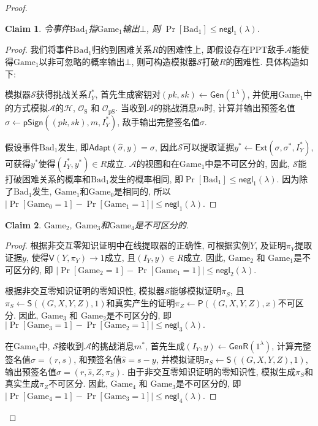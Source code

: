 \documentclass[review]{jcr}
\newtheorem{claim}{Claim}
\begin{document}
\begin{proof}
\begin{claim}
令事件$\text{Bad}_1$指$\text{Game}_1$输出$\bot$, 则 $\Pr[\text{Bad}_1] \leq \mathsf{negl}_1(\lambda)$.
\end{claim}

\begin{proof}
我们将事件$\text{Bad}_1$归约到困难关系$R$的困难性上, 即假设存在PPT敌手$\mathcal{A}$能使得$\text{Game}_1$以非可忽略的概率输出$\bot$, 则可构造模拟器$\mathcal{S}$打破$R$的困难性. 具体构造如下: 

模拟器$\mathcal{S}$获得挑战关系$I_Y^*$, 首先生成密钥对$(pk, sk)\leftarrow \mathsf{Gen}(1^\lambda)$, 并使用$\text{Game}_1$中的方式模拟$\mathcal{A}$的$\mathcal{H}$, $\mathcal{O}_{\text{S}}$ 和 $\mathcal{O}_{\text{pS}}$. 当收到$\mathcal{A}$的挑战消息$m$时, 计算并输出预签名值$\hat{\sigma}\leftarrow \mathsf{pSign}((pk,sk), m, I_Y^*)$, 敌手输出完整签名值$\sigma$. 

假设事件$\text{Bad}_1$发生, 即$\mathsf{Adapt}(\hat{\sigma},y) = \sigma$, 因此$\mathcal{S}$可以提取证据$y^*\leftarrow\mathsf{Ext}(\sigma, \sigma^*, I_Y^*)$, 可获得$y^*$使得$(I_Y^*, y^*)\in R$成立. $\mathcal{A}$的视图和在$\text{Game}_1$中是不可区分的, 因此, $\mathcal{S}$能打破困难关系的概率和$\text{Bad}_1$发生的概率相同, 即$\Pr[\text{Bad}_1] \leq \mathsf{negl}_1(\lambda)$. 因为除了$\text{Bad}_1$发生, $\text{Game}_1$和$\text{Game}_0$是相同的, 所以 $|\Pr[\text{Game}_0 = 1]-\Pr[\text{Game}_1 = 1]|\leq \mathsf{negl}_1(\lambda).$
\end{proof}

\begin{claim}
$\text{Game}_2$, $\text{Game}_3$和$\text{Game}_4$是不可区分的. 
\end{claim}

\begin{proof}
根据非交互零知识证明中在线提取器的正确性, 可根据实例$Y$, 及证明$\pi_Y$提取证据$y$, 使得$\mathsf{V}(Y, \pi_Y) \rightarrow 1$成立, 且$(I_Y, y) \in R$成立. 因此, $\text{Game}_2$ 和 $\text{Game}_1$是不可区分的, 即
$|\Pr[\text{Game}_2 = 1] - \Pr[\text{Game}_1 = 1]|\leq \mathsf{negl}_2(\lambda).$

根据非交互零知识证明的零知识性, 模拟器$\mathcal{S}$能够模拟证明$\pi_S$, 且$\pi_S\leftarrow \mathsf{S}((G,X,Y,Z),1)$和真实产生的证明$\pi_Z\leftarrow \mathsf{P}((G,X,Y,Z), x)$不可区分. 因此, $\text{Game}_3$ 和 $\text{Game}_2$是不可区分的, 即
$|\Pr[\text{Game}_3 = 1]-\Pr[\text{Game}_2 = 1]| \leq \mathsf{negl}_3(\lambda).$

在$\text{Game}_4$中, $\mathcal{S}$接收到$\mathcal{A}$的挑战消息$m^*$, 首先生成$(I_Y,y)\leftarrow \mathsf{GenR}(1^\lambda)$, 计算完整签名值$\sigma=(r,s)$, 和预签名值$\hat{s}=s-y$, 并模拟证明$\pi_S\leftarrow \mathsf{S}((G,X,Y,Z),1)$, 输出预签名值$\hat{\sigma}=(r,\hat{s},Z,\pi_S)$. 由于非交互零知识证明的零知识性, 模拟生成$\pi_S$和真实生成$\pi_Z$不可区分. 因此, $\text{Game}_4$ 和 $\text{Game}_3$是不可区分的, 即
$|\Pr[\text{Game}_4 = 1]-\Pr[\text{Game}_3 = 1]| \leq  \mathsf{negl}_4(\lambda).$
\end{proof}


\end{proof}
\end{document}
